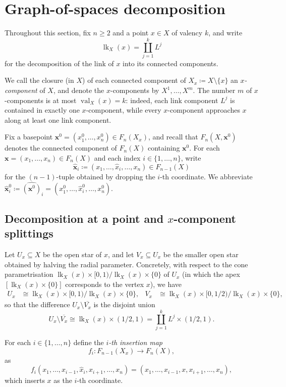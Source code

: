 \documentclass[reqno]{amsart}
\theoremstyle{definition}
\newcommand\bfx{\mathbf{x}}
\newcommand{\base}{\bfx^0}
\DeclareMathOperator{\lk}{lk}
\DeclareMathOperator{\val}{val}
\numberwithin{equation}{section}
\begin{document}
\section{Graph-of-spaces decomposition}
\label{sec:config-decomposition}

Throughout this section, fix \(n\ge 2\) and a point \(x\in X\) of
valency \(k\), and write
\[
\lk_X(x) = \coprod_{j=1}^{k} L^j
\]
for the decomposition of the link of \(x\) into its connected
components.

We call the closure (in \(X\)) of each connected component of
\(X_x\coloneqq X\setminus\{x\}\) an \emph{\(x\)-component} of \(X\), and
denote the \(x\)-components by \(X^1,\dots,X^m\). The number \(m\) of
\(x\)-components is at most \(\val_X(x)=k\): indeed, each link
component \(L^j\) is contained in exactly one \(x\)-component, while
every \(x\)-component approaches \(x\) along at least one link
component.

Fix a basepoint \(\base=(x_1^0,\dots,x_n^0)\in F_n(X_x)\), and recall
that \(F_n(X,\base)\) denotes the connected component of \(F_n(X)\)
containing \(\base\). For each \(\bfx=(x_1,\dots,x_n)\in F_n(X)\)
and each index \(i\in\{1,\dots,n\}\), write
\[
\hat{\bfx}_i
\coloneqq
(x_1,\dots,\hat{x}_i,\dots,x_n)\in F_{n-1}(X)
\]
for the \((n-1)\)-tuple obtained by dropping the \(i\)-th coordinate.
We abbreviate \(\hat{\bfx}^0_i\coloneqq\widehat{(\base)}_i
=(x_1^0,\dots,\hat{x}_i^0,\dots,x_n^0)\).

\subsection{Decomposition at a point and \(x\)-component
splittings}
\label{ssec:decomposition-splittings}

Let \(U_x\subseteq X\) be the open star of \(x\), and let
\(V_x\subseteq U_x\) be the smaller open star obtained by halving
the radial parameter. Concretely, with respect to the cone
parametrisation \(\lk_X(x)\times[0,1)/\lk_X(x)\times\{0\}\)
of \(U_x\) (in which the apex \([\lk_X(x)\times\{0\}]\)
corresponds to the vertex \(x\)), we have
\begin{align*}
U_x&\cong \lk_X(x)\times[0,1)\big/\lk_X(x)\times\{0\},
&
V_x&\cong \lk_X(x)\times[0,1/2)\big/\lk_X(x)\times\{0\},
\end{align*}
so that the difference \(U_x\setminus \overline{V_x}\) is the disjoint
union
\[
U_x\setminus \overline{V_x}
\cong \lk_X(x)\times(1/2,1)=
\coprod_{j=1}^k L^j\times(1/2,1).
\]


For each \(i\in\{1,\dots,n\}\)
define the \emph{\(i\)-th insertion map}
\[
f_i\colon F_{n-1}(X_x)\longrightarrow F_n(X), 
\]
as
\[
f_i(x_1,\dots,x_{i-1},\hat x_i,x_{i+1},\dots,x_n)
=
(x_1,\dots,x_{i-1},x,x_{i+1},\dots,x_n),
\]
which inserts \(x\) as the \(i\)-th coordinate.
\end{document}
